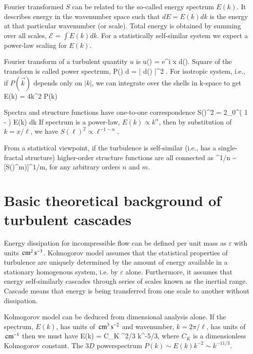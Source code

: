 \documentclass[usenatbib,twocolumn]{aastex63}
\newcommand{\ene}[2]{\mathcal{E}_{#1}^{#2}} %
\begin{document}
Fourier transformed $S$ can be related to the so-called energy spectrum $E(k)$.
It describes energy in the wavenumber space such that $dE = E(k) dk$ is the energy at that particular wavenumber (or scale).
Total energy is obtained by summing over all scales, $\ene{}{} = \int E(k) dk$.
For a statistically self-similar system we expect a power-law scaling for $E(k)$.


Fourier transform of a turbulent quantity $u$ is
\be
u(\vec{\ell}) = \int e^{i  x} d().
\ee
Square of the transform is called power spectrum,
\be
P() d = \langle | d() |^2 \rangle.
\ee
For isotropic system, i.e., if $P(\vec{k})$ depends only on $|k|$, we can integrate over the shells in k-space to get
\be
E(k) = 4\pi k^2 P(k)
\ee

Spectra and structure functions have one-to-one correspondence
\be
S(\ell)^2 = 2\int_0^\infty \left( 1 - \right) E(k) dk
\ee
If spectrum is a power-law, $E(k) \propto k^\alpha$, then by substitution of $k = x/\ell$, we have $S(\ell)^2 \propto \ell^{-1-\alpha}$.


From a statistical viewpoint, if the turbulence is self-similar (i.e., has a single-fractal structure) higher-order structure functions are all connected as 
\be
[S(\ell)^n)]^{1/n} \sim [S(\ell)^m)]^{1/m},
\ee
for any arbitrary orders $n$ and $m$.


\section{Basic theoretical background of turbulent cascades}\label{sect:theory}

Energy dissipation for incompressible flow can be defined per unit mass as $\varepsilon$ with units $\, \mathrm{cm}^2 \, \mathrm{s}^{-3}$.
Kolmogorov model assumes that the statistical properties of turbulence are uniquely determined by the amount of energy available in a stationary homogenous system, i.e. by $\varepsilon$ alone.
Furthermore, it assumes that energy self-similarly cascades through series of scales known as the inertial range.
Cascade means that energy is being transferred from one scale to another without dissipation.

Kolmogorov model can be deduced from dimensional analysis alone.
If the spectrum, $E(k)$, has units of $\, \mathrm{cm}^3 \, \mathrm{s}^{-2}$ and wavenumber, $k = 2\pi/\ell$, has units of $\, \mathrm{cm}^{-1}$ then we must have
\be
E(k) = C_K \varepsilon^{2/3} k^{-5/3},
\ee
where $C_K$ is a dimensionless Kolmogorov constant.
The $3D$ powerspectrum $P(k) \sim E(k) k^{-2} \sim k^{-11/3}$.
\end{document}
